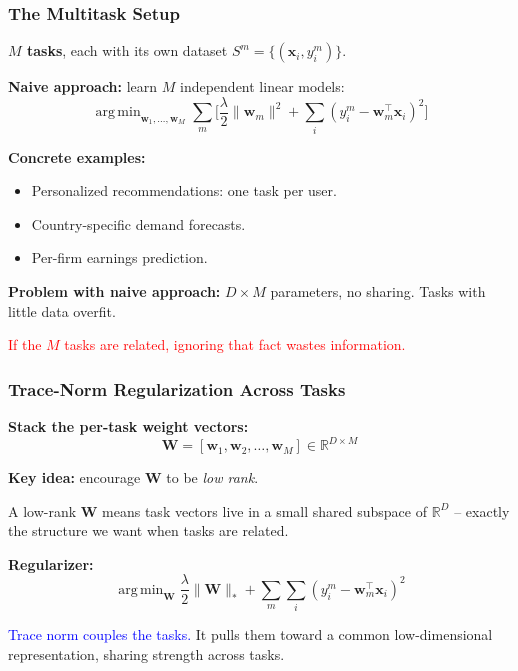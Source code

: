 \documentclass[notes,11pt, aspectratio=169]{beamer}
\DeclareMathOperator*{\argmin}{arg\,min}
\newcommand{\vx}{\mathbf{x}}
\newcommand{\vw}{\mathbf{w}}
\newcommand{\vW}{\mathbf{W}}
\newcommand{\R}{\mathbb{R}}
\begin{document}
\begin{frame}
\frametitle{The Multitask Setup}

\textbf{$M$ tasks}, each with its own dataset $S^m = \{(\vx_i, y_i^m)\}$.

\vspace{4pt}
\textbf{Naive approach:} learn $M$ independent linear models:
\[
    \argmin_{\vw_1, \ldots, \vw_M} \sum_m \biggl[\frac{\lambda}{2} \|\vw_m\|^2 + \sum_i (y_i^m - \vw_m^\top \vx_i)^2\biggr]
\]

\vspace{6pt}
\textbf{Concrete examples:}
\begin{itemize}
    \item Personalized recommendations: one task per user.
    \item Country-specific demand forecasts.
    \item Per-firm earnings prediction.
\end{itemize}

\vspace{8pt}
\textbf{Problem with naive approach:} $D \times M$ parameters, no sharing. Tasks with little data overfit.

\vspace{4pt}
\textcolor{red}{If the $M$ tasks are related, ignoring that fact wastes information.}
\end{frame}

\begin{frame}
\frametitle{Trace-Norm Regularization Across Tasks}

\textbf{Stack the per-task weight vectors:}
\[
    \vW = [\vw_1, \vw_2, \ldots, \vw_M] \in \R^{D \times M}
\]

\vspace{6pt}
\textbf{Key idea:} encourage $\vW$ to be \emph{low rank}.

\vspace{4pt}
A low-rank $\vW$ means task vectors live in a small shared subspace of $\R^D$ -- exactly the structure we want when tasks are related.

\vspace{8pt}
\textbf{Regularizer:}
\[
    \argmin_{\vW} \frac{\lambda}{2} \|\vW\|_* + \sum_m \sum_i (y_i^m - \vw_m^\top \vx_i)^2
\]

\vspace{8pt}
\textcolor{blue}{Trace norm couples the tasks.} It pulls them toward a common low-dimensional representation, sharing strength across tasks.
\end{frame}
\end{document}
